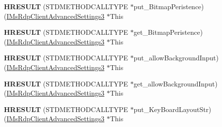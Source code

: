 \begin{DoxyCompactItemize}
\item 
\mbox{\label{struct_m_s_t_s_c_lib_1_1_i_ms_rdp_client_advanced_settings3_vtbl_aca251f93642d109d0d9843acbbffd90b}} 
{\bfseries H\+R\+E\+S\+U\+LT} (S\+T\+D\+M\+E\+T\+H\+O\+D\+C\+A\+L\+L\+T\+Y\+PE $\ast$put\+\_\+\+Bitmap\+Peristence)(\hyperlink{interface_m_s_t_s_c_lib_1_1_i_ms_rdp_client_advanced_settings3}{I\+Ms\+Rdp\+Client\+Advanced\+Settings3} $\ast$This
\item 
\mbox{\label{struct_m_s_t_s_c_lib_1_1_i_ms_rdp_client_advanced_settings3_vtbl_a5b987d3186eb7391d50259e3b0f382a5}} 
{\bfseries H\+R\+E\+S\+U\+LT} (S\+T\+D\+M\+E\+T\+H\+O\+D\+C\+A\+L\+L\+T\+Y\+PE $\ast$get\+\_\+\+Bitmap\+Peristence)(\hyperlink{interface_m_s_t_s_c_lib_1_1_i_ms_rdp_client_advanced_settings3}{I\+Ms\+Rdp\+Client\+Advanced\+Settings3} $\ast$This
\item 
\mbox{\label{struct_m_s_t_s_c_lib_1_1_i_ms_rdp_client_advanced_settings3_vtbl_a8d5747f98617d29440c2391da5884284}} 
{\bfseries H\+R\+E\+S\+U\+LT} (S\+T\+D\+M\+E\+T\+H\+O\+D\+C\+A\+L\+L\+T\+Y\+PE $\ast$put\+\_\+allow\+Background\+Input)(\hyperlink{interface_m_s_t_s_c_lib_1_1_i_ms_rdp_client_advanced_settings3}{I\+Ms\+Rdp\+Client\+Advanced\+Settings3} $\ast$This
\item 
\mbox{\label{struct_m_s_t_s_c_lib_1_1_i_ms_rdp_client_advanced_settings3_vtbl_a8e07cc5754818dce7ef8afd47ea3c384}} 
{\bfseries H\+R\+E\+S\+U\+LT} (S\+T\+D\+M\+E\+T\+H\+O\+D\+C\+A\+L\+L\+T\+Y\+PE $\ast$get\+\_\+allow\+Background\+Input)(\hyperlink{interface_m_s_t_s_c_lib_1_1_i_ms_rdp_client_advanced_settings3}{I\+Ms\+Rdp\+Client\+Advanced\+Settings3} $\ast$This
\item 
\mbox{\label{struct_m_s_t_s_c_lib_1_1_i_ms_rdp_client_advanced_settings3_vtbl_a2ff58266a7cf34fdffe5227d7f784f5c}} 
{\bfseries H\+R\+E\+S\+U\+LT} (S\+T\+D\+M\+E\+T\+H\+O\+D\+C\+A\+L\+L\+T\+Y\+PE $\ast$put\+\_\+\+Key\+Board\+Layout\+Str)(\hyperlink{interface_m_s_t_s_c_lib_1_1_i_ms_rdp_client_advanced_settings3}{I\+Ms\+Rdp\+Client\+Advanced\+Settings3} $\ast$This
\item 

\end{DoxyCompactItemize}
